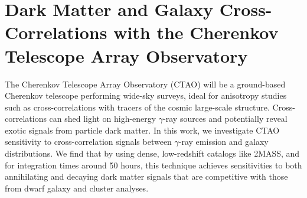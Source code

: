 %
%
\section{Dark Matter and Galaxy Cross-Correlations with the Cherenkov Telescope Array Observatory}
\label{sec:xcorr_paper}

The Cherenkov Telescope Array Observatory (CTAO) will be a ground-based Cherenkov telescope performing wide-sky surveys, ideal for anisotropy studies such as cross-correlations with tracers of the cosmic large-scale structure. Cross-correlations can shed light on high-energy $\gamma$-ray sources and potentially reveal exotic signals from particle dark matter. In this work, we investigate CTAO sensitivity to cross-correlation signals between $\gamma$-ray emission and galaxy distributions. We find that by using dense,  low-redshift catalogs like 2MASS, and for integration times around 50 hours, this technique achieves sensitivities to both annihilating and decaying dark matter signals that are competitive with those from dwarf galaxy and cluster analyses.








\begin{subappendices}



\end{subappendices}